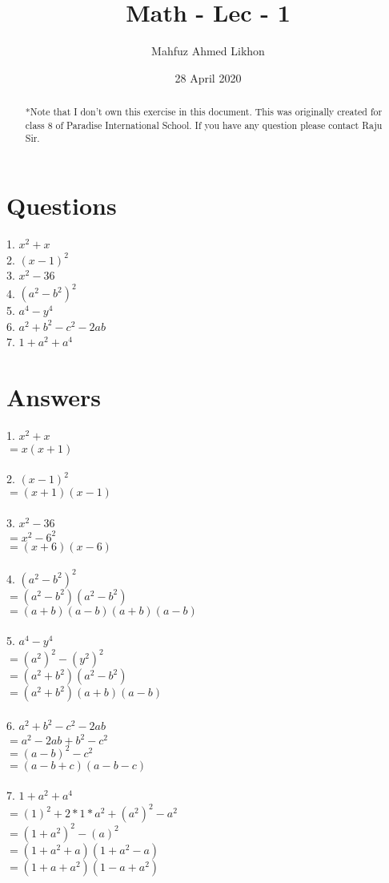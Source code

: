 \documentclass{article}
\title{Math - Lec - 1}
\author{Mahfuz Ahmed Likhon}
\date{28 April 2020}
\begin{document}
    \maketitle
    \begin{abstract}
*Note that I don't own this exercise in this document. This was originally created
for class 8 of Paradise International School. If you have any question please contact Raju Sir.
    \end{abstract}
\section{Questions}
\Large
1. $x^2+x$ \\
2. $(x-1)^2$ \\
3. $x^2-36$ \\
4. $(a^2-b^2)^2$ \\
5. $a^4 - y^4$ \\
6. $a^2+b^2-c^2-2ab$ \\
7. $1+a^2+a^4$
\newpage
\section{Answers}
1. $x^2+x$ \\
   $=x(x + 1)$\\ \\
2. $(x-1)^2$ \\
   $=(x+1)(x-1)$\\ \\
3. $x^2-36$ \\
   $=x^2-6^2$\\
   $=(x+6)(x-6)$\\ \\
4. $(a^2-b^2)^2$ \\
   $=(a^2-b^2)(a^2-b^2)$\\
   $=(a+b)(a-b)(a+b)(a-b)$\\ \\
5. $a^4 - y^4$ \\
   $=(a^2)^2-(y^2)^2$\\
   $=(a^2+b^2)(a^2-b^2)$\\
   $=(a^2+b^2)(a+b)(a-b)$\\ \\
6. $a^2+b^2-c^2-2ab$ \\
   $=a^2-2ab+b^2-c^2$\\
   $=(a-b)^2-c^2$\\
   $=(a-b+c)(a-b-c)$\\ \\
7. $1+a^2+a^4$\\
   $=(1)^2+2*1*a^2+(a^2)^2-a^2$\\
   $=(1+a^2)^2-(a)^2$\\
   $=(1+a^2+a)(1+a^2-a)$\\
   $=(1+a+a^2)(1-a+a^2)$
\end{document}
